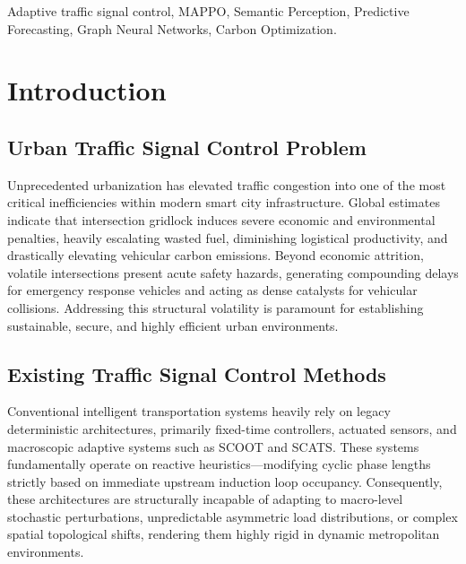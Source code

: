 \documentclass[journal]{IEEEtran}
\begin{document}
\begin{abstract}
The proposed evaluation protocol investigates this multi-objective formulation leveraging SUMO, BDD100K, and Cityscapes across 64 cooperative intersections for 10,000 continuous episodes over 5 random seeds on an NVIDIA A100 computing cluster. 

Ultimately, this framework is anticipated to demonstrate that extreme multimodality can be effectively synthesized within deep reinforcement learning to establish highly resilient, sustainable traffic control for real-world deployment.
\end{abstract}

\begin{IEEEkeywords}
Adaptive traffic signal control, MAPPO, Semantic Perception, Predictive Forecasting, Graph Neural Networks, Carbon Optimization.
\end{IEEEkeywords}



\section{Introduction}

\subsection{Urban Traffic Signal Control Problem}
Unprecedented urbanization has elevated traffic congestion into one of the most critical inefficiencies within modern smart city infrastructure. Global estimates indicate that intersection gridlock induces severe economic and environmental penalties, heavily escalating wasted fuel, diminishing logistical productivity, and drastically elevating vehicular carbon emissions. Beyond economic attrition, volatile intersections present acute safety hazards, generating compounding delays for emergency response vehicles and acting as dense catalysts for vehicular collisions. Addressing this structural volatility is paramount for establishing sustainable, secure, and highly efficient urban environments.

\subsection{Existing Traffic Signal Control Methods}
Conventional intelligent transportation systems heavily rely on legacy deterministic architectures, primarily fixed-time controllers, actuated sensors, and macroscopic adaptive systems such as SCOOT and SCATS. These systems fundamentally operate on reactive heuristics—modifying cyclic phase lengths strictly based on immediate upstream induction loop occupancy. Consequently, these architectures are structurally incapable of adapting to macro-level stochastic perturbations, unpredictable asymmetric load distributions, or complex spatial topological shifts, rendering them highly rigid in dynamic metropolitan environments.
\end{document}
